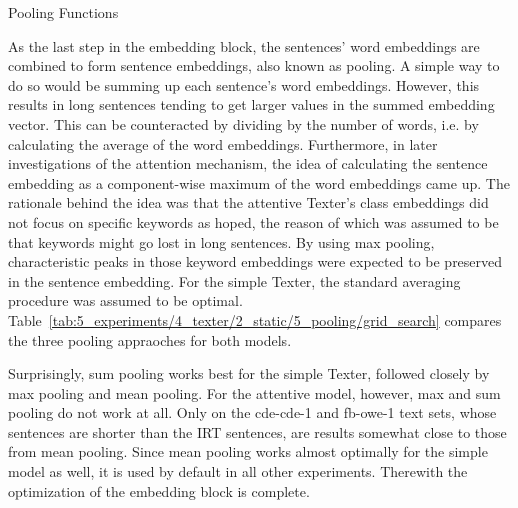 \begin{table}
    \centering
    
    \caption{Pooling Functions}
    \label{tab:5_experiments/4_texter/2_static/5_pooling/grid_search}
\end{table}

As the last step in the embedding block, the sentences' word embeddings are combined to form sentence embeddings, also known as pooling. A simple way to do so would be summing up each sentence's word embeddings. However, this results in long sentences tending to get larger values in the summed embedding vector. This can be counteracted by dividing by the number of words, i.e. by calculating the average of the word embeddings. Furthermore, in later investigations of the attention mechanism, the idea of calculating the sentence embedding as a component-wise maximum of the word embeddings came up. The rationale behind the idea was that the attentive Texter's class embeddings did not focus on specific keywords as hoped, the reason of which was assumed to be that keywords might go lost in long sentences. By using max pooling, characteristic peaks in those keyword embeddings were expected to be preserved in the sentence embedding. For the simple Texter, the standard averaging procedure was assumed to be optimal. Table~\ref{tab:5_experiments/4_texter/2_static/5_pooling/grid_search} compares the three pooling appraoches for both models.

Surprisingly, sum pooling works best for the simple Texter, followed closely by max pooling and mean pooling. For the attentive model, however, max and sum pooling do not work at all. Only on the cde-cde-1 and fb-owe-1 text sets, whose sentences are shorter than the IRT sentences, are results somewhat close to those from mean pooling. Since mean pooling works almost optimally for the simple model as well, it is used by default in all other experiments. Therewith the optimization of the embedding block is complete.
